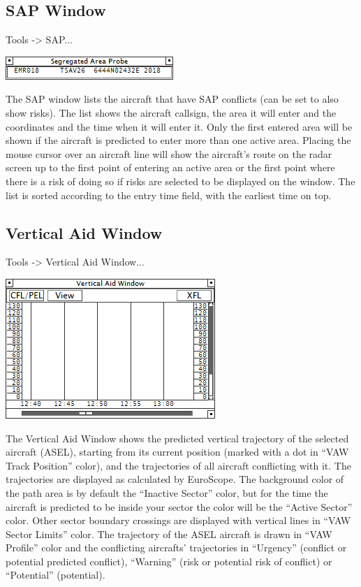\documentclass[11pt,a4paper]{memoir}
\begin{document}
\subsection{SAP Window}
\label{win:sap}

\textit{} Tools -> SAP...

\includegraphics{img/sap.png}

The SAP window lists the aircraft that have SAP conflicts (can be set to also show risks). The list shows the aircraft callsign, the area it will enter and the coordinates and the time when it will enter it. Only the first entered area will be shown if the aircraft is predicted to enter more than one active area. Placing the mouse cursor over an aircraft line will show the aircraft’s route on the radar screen up to the first point of entering an active area or the first point where there is a risk of doing so if risks are selected to be displayed on the window. The list is sorted according to the entry time field, with the earliest time on top.

\subsection{Vertical Aid Window}
\label{win:vaw}

\textit{} Tools -> Vertical Aid Window...

\includegraphics{img/vaw.png}

The Vertical Aid Window shows the predicted vertical trajectory of the selected aircraft (ASEL), starting from its current position (marked with a dot in “VAW Track Position” color), and the trajectories of all aircraft conflicting with it. The trajectories are displayed as calculated by EuroScope. The background color of the path area is by default the “Inactive Sector” color, but for the time the aircraft is predicted to be inside your sector the color will be the “Active Sector” color. Other sector boundary crossings are displayed with vertical lines in “VAW Sector Limits” color. The trajectory of the ASEL aircraft is drawn in “VAW Profile” color and the conflicting aircrafts’ trajectories in “Urgency” (conflict or potential predicted conflict), “Warning” (risk or potential risk of conflict) or “Potential” (potential).
\end{document}
